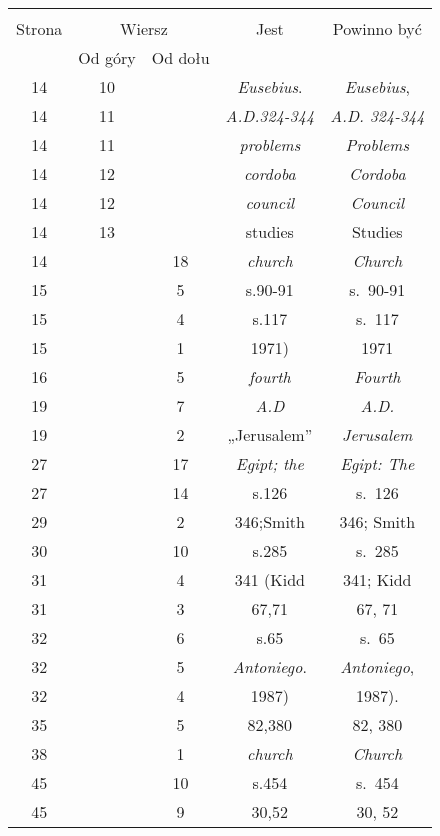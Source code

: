 \documentclass[a4paper,11pt]{article}
\begin{document}
\begin{center}

  \begin{tabular}{|c|c|c|c|c|}
    \hline
    & \multicolumn{2}{c|}{} & & \\
    Strona & \multicolumn{2}{c|}{Wiersz} & Jest
                              & Powinno być \\ \cline{2-3}
    & Od góry & Od dołu & & \\
    \hline
    14  & 10 & & \emph{Eusebius}. & \emph{Eusebius}, \\
    14  & 11 & & \emph{A.D.324-344} & \emph{A.D. 324-344} \\
    14  & 11 & & \emph{problems} & \emph{Problems} \\
    14  & 12 & & \emph{cordoba} & \emph{Cordoba} \\
    14  & 12 & & \emph{council} & \emph{Council} \\
    14  & 13 & & studies & Studies \\
    14  & & 18 & \emph{church} & \emph{Church} \\
    15  & &  5 & s.90-91 & s.~90-91 \\
    15  & &  4 & s.117 & s.~117 \\
    15  & &  1 & 1971) & 1971 \\
    16  & &  5 & \emph{fourth} & \emph{Fourth} \\
    19  & &  7 & \emph{A.D} & \emph{A.D.} \\
    19  & &  2 & „Jerusalem” & \emph{Jerusalem} \\
    27  & & 17 & \emph{Egipt; the} & \emph{Egipt: The} \\
    27  & & 14 & s.126 & s.~126 \\
    29  & &  2 & 346;Smith & 346; Smith\\
    30  & & 10 & s.285 & s.~285 \\
    31  & &  4 & 341 (Kidd & 341; Kidd \\
    31  & &  3 & 67,71 & 67, 71 \\
    32  & &  6 & s.65 & s.~65 \\
    32  & &  5 & \emph{Antoniego}. & \emph{Antoniego}, \\
    32  & &  4 & 1987) & 1987). \\
    35  & &  5 & 82,380 & 82, 380 \\
    38  & &  1 & \emph{church} & \emph{Church} \\
    45  & & 10 & s.454 & s.~454 \\
    45  & &  9 & 30,52 & 30, 52 \\

\end{tabular}
\end{center}
\end{document}
